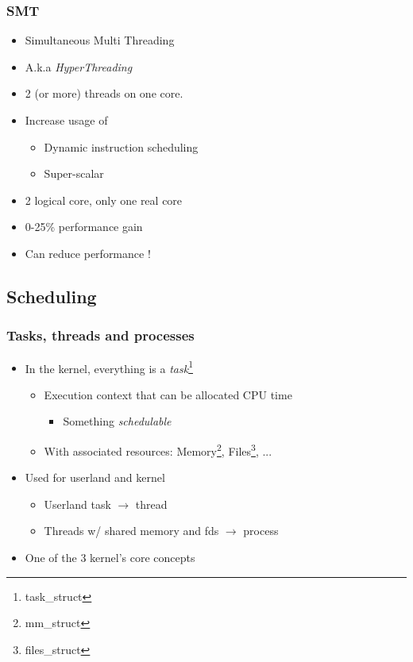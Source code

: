 \begin{frame}
  \frametitle{SMT}

  \begin{itemize}
  \item Simultaneous Multi Threading
  \item A.k.a \emph{HyperThreading}
  \item 2 (or more) threads on one core.
  \item Increase usage of
    \begin{itemize}
    \item Dynamic instruction scheduling
    \item Super-scalar
    \end{itemize}
  \item 2 logical core, only one real core
  \item 0-25\% performance gain
  \item Can reduce performance !
  \end{itemize}
\end{frame}

\subsection{Scheduling}
\label{subsec:sched}


\begin{frame}
  \frametitle{Tasks, threads and processes}

  \begin{itemize}
  \item In the kernel, everything is a \emph{task}\footnote{task\_struct}
    \begin{itemize}
    \item Execution context that can be allocated CPU time
      \begin{itemize}
      \item Something \emph{schedulable}
      \end{itemize}
    \item With associated resources: Memory\footnote{mm\_struct}, Files\footnote{files\_struct}, ...
    \end{itemize}
  \item Used for userland and kernel
    \begin{itemize}
    \item Userland task $\rightarrow$ thread
    \item Threads w/ shared memory and fds $\rightarrow$ process
    \end{itemize}
  \item One of the 3 kernel's core concepts
  \end{itemize}
\end{frame}


